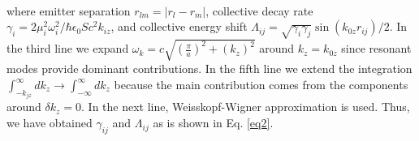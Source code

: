 \documentclass[aps,showpacs,twocolumn,twoside,groupedaddress]{revtex4}
\begin{document}
\begin{widetext}
\begin{equation}
\begin{split}
\end{split}
\end{equation}
where emitter separation $r_{lm}=|r_{l}-r_{m}|$, collective decay rate $\gamma_{i}=2\mu_{i}^{2}\omega_{i}^{2}/\hbar\epsilon_{0}Sc^{2}k_{iz}$, and collective energy shift $\Lambda_{ij}=\sqrt{\gamma_{i}\gamma_{j}}\sin(k_{0z}r_{ij})/2$.
In the third line we expand $\omega_{k}=c\sqrt{(\frac{\pi}{a})^{2}+(k_{z})^{2}}$ around $k_{z}=k_{0z}$ since resonant modes provide dominant contributions. In the fifth line we extend the integration $\int_{-k_{jz}}^{\infty}dk_{z}\rightarrow\int_{-\infty}^{\infty}dk_{z}$ because the main contribution comes from the components around $\delta k_{z}=0$. In the next line, Weisskopf-Wigner approximation is used. Thus, we have obtained $\gamma_{ij}$ and $\Lambda_{ij}$ as is shown in Eq. \eqref{eq2}. 


\end{widetext}
\end{document}
